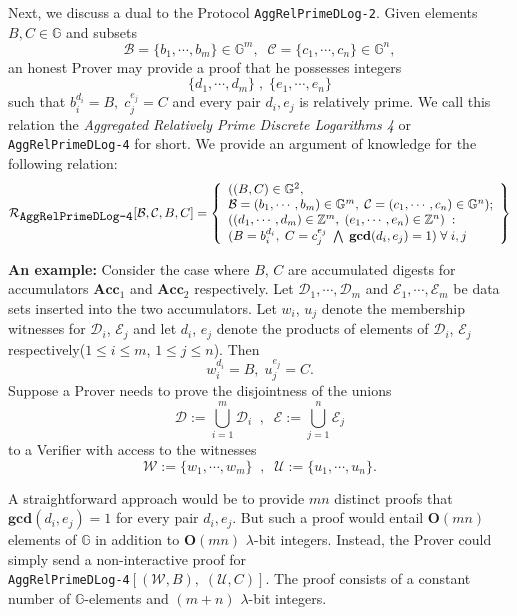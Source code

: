 \documentclass[11pt, lettersize, notitlepage, leqno, footskip=0.6cm]{article}
\newcommand{\bz}{\mathbb Z}
\newcommand{\Acc}{\mbf{Acc}}
\newcommand{\mc}{\mathcal}
\newcommand{\mb}{\mathbb}
\newcommand{\mbf}{\mathbf}
\newcommand{\lamb}{\lambda}
\newcommand{\vs}{\vspace{-0.15cm}}
\newcommand{\GCD}{\mbf{gcd}}
\numberwithin{equation}{section}
\begin{document}
Next, we discuss a dual to the Protocol \verb|AggRelPrimeDLog-2|. Given elements $B, C\in \mb{G}$ and subsets \vspace{-0.15cm}$$\mc{B} = \{b_1,\cdots, b_m\}\in \mb{G}^m,\;\; \mc{C} = \{c_1,\cdots, c_n\}\in \mb{G}^n,$$ an honest Prover may provide a proof that he possesses integers \vs $$\{d_1,\cdots, d_m\}\;,\; \{e_1,\cdots, e_n\}$$ such that $b_i^{d_i} = B,\; c_j^{e_j} = C$ and every pair $d_i, e_j$ is relatively prime. We call this relation the \textit{Aggregated Relatively Prime Discrete Logarithms 4} or \verb|AggRelPrimeDLog-4| for short. We provide an argument of knowledge for the following relation:
\[
  \mc{R}_{{\protect\verb|AggRelPrimeDLog-4|}}[\mc{B}, \mc{C}, B, C] = \left\{\begin{array}{l}
    ((B,C)\in\mb{G}^2,\;\\
     \mc{B} = (b_1,\cdots,b_m)\in\mb{G}^m,\;\mc{C} = (c_1,\cdots, c_n)\in\mb{G}^n);\\
    ((d_1,\cdots,d_m)\in\bz^m,\; (e_1,\cdots,e_n)\in\bz^n)\;: \\
    (B = b_i^{d_i},\; C = c_j^{e_j}\;\bigwedge \; \GCD(d_i, e_j) = 1)\;\forall \;i,j
  \end{array}\right\}
\] 

\noindent \textbf{An example:} Consider the case where $B$, $C$ are accumulated digests for accumulators $\Acc_1$ and $\Acc_2$ respectively. Let $\mc{D}_1,\cdots,\mc{D}_m$ and $\mc{E}_1,\cdots,\mc{E}_m$ be data sets inserted into the two accumulators. Let $w_i$, $u_j$ denote the membership witnesses for $\mc{D}_i$, $\mc{E}_j$ and let $d_i$, $e_j$ denote the products of elements of $\mc{D}_i$, $\mc{E}_j$ respectively($1\leq i\leq m$, $1\leq j\leq n$). Then $$w_i^{d_i} = B,\; u_j^{e_j} = C.$$ Suppose a Prover needs to prove the disjointness of the unions $$\mc{D} := \bigcup\limits_{i=1}^m \mc{D}_i\;\;,\;\;\mc{E} := \bigcup\limits_{j=1}^n \mc{E}_j$$ to a Verifier with access to the witnesses \vspace{-0.15cm}$$\mc{W}:= \{w_1,\cdots,w_m \}\;\;,\;\;\mc{U}:= \{u_1,\cdots,u_n \}.$$

A straightforward approach would be to provide $mn$ distinct proofs that $\GCD(d_i, e_j) = 1$ for every pair $d_i,e_j$. But such a proof would entail $\mbf{O}(mn)$ elements of $\mb{G}$ in addition to $\mbf{O}(mn)$ $\lamb$-bit integers. Instead, the Prover could simply send a non-interactive proof for\\ \verb|AggRelPrimeDLog-4|$[(\mc{W}, B),\;(\mc{U}, C)]$. The proof consists of a constant number of $\mb{G}$-elements and $(m+n)$ $\lamb$-bit integers.\vspace{0.1cm} 
\end{document}
